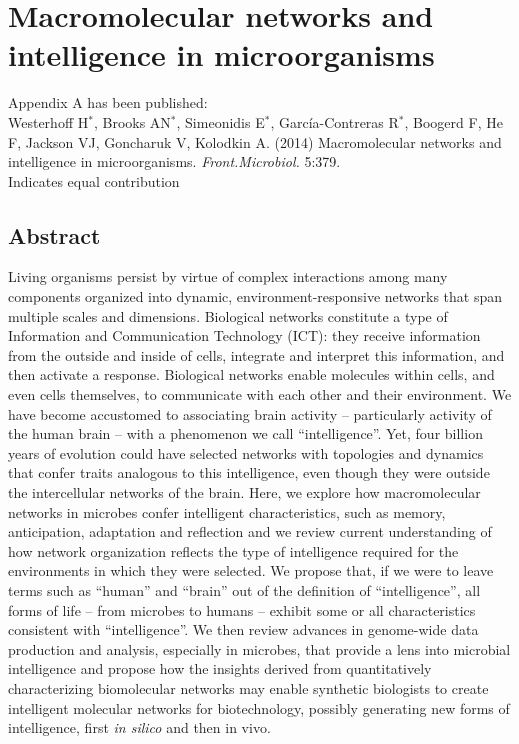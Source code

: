  
\chapter{Macromolecular networks and intelligence in microorganisms}

\label{appendix:a}

\noindent Appendix A has been published:\\

\noindent Westerhoff H$^{*}$, Brooks AN$^{*}$, Simeonidis E$^{*}$, García-Contreras  R$^{*}$, Boogerd F, He  F,   Jackson VJ, Goncharuk V, Kolodkin A. (2014) Macromolecular networks and intelligence in microorganisms. \emph{Front.Microbiol.} 5:379. \\ 

\noindent * Indicates equal contribution 

\section{Abstract}
Living organisms persist by virtue of complex interactions among many components organized into dynamic, environment-responsive networks that span multiple scales and dimensions. Biological networks constitute a type of Information and Communication Technology (ICT): they receive information from the outside and inside of cells, integrate and interpret this information, and then activate a response. Biological networks enable molecules within cells, and even cells themselves, to communicate with each other and their environment. We have become accustomed to associating brain activity – particularly activity of the human brain – with a phenomenon we call ``intelligence''. Yet, four billion years of evolution could have selected networks with topologies and dynamics that confer traits analogous to this intelligence, even though they were outside the intercellular networks of the brain. Here, we explore how macromolecular networks in microbes confer intelligent characteristics, such as memory, anticipation, adaptation and reflection and we review current understanding of how network organization reflects the type of intelligence required for the environments in which they were selected. We propose that, if we were to leave terms such as ``human'' and ``brain'' out of the definition of ``intelligence'', all forms of life – from microbes to humans – exhibit some or all characteristics consistent with ``intelligence''. We then review advances in genome-wide data production and analysis, especially in microbes, that provide a lens into microbial intelligence and propose how the insights derived from quantitatively characterizing biomolecular networks may enable synthetic biologists to create intelligent molecular networks for biotechnology, possibly generating new forms of intelligence, first \textit{in silico} and then in vivo.

